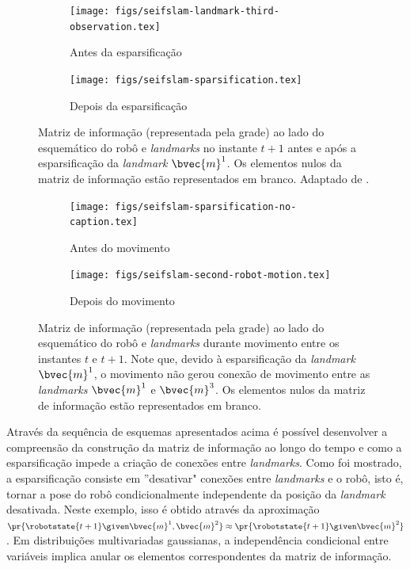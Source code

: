\begin{figure}[h]
  \begin{subfigure}{0.475\textwidth}
    \texttt{[image: figs/seifslam-landmark-third-observation.tex]}
    \caption{Antes da esparsificação}
  \end{subfigure}
  \hfill
  \begin{subfigure}{0.475\textwidth}
    \texttt{[image: figs/seifslam-sparsification.tex]} 
    \caption{Depois da esparsificação}
  \end{subfigure}
  \caption[Esparsificação de um \textit{landmark} na matriz de informação]{Matriz de informação (representada pela grade) ao lado do esquemático do robô e \textit{landmarks} no instante $t+1$ antes e após a esparsificação da \textit{landmark} $\bvec{m}^1$. Os elementos nulos da matriz de informação estão representados em branco. Adaptado de \cite[p.~389]{thrun2005probabilistic}.}
  \label{fig:seifslam-info-matrix-sparsification}
\end{figure}

\begin{figure}[h]
  \begin{subfigure}{0.475\textwidth}
    \texttt{[image: figs/seifslam-sparsification-no-caption.tex]}
    \caption{Antes do movimento}
  \end{subfigure}
  \hfill
  \begin{subfigure}{0.475\textwidth}
    \texttt{[image: figs/seifslam-second-robot-motion.tex]} 
    \caption{Depois do movimento}
    \label{fig:seifslam-info-matrix-construction-second-motion-b}
  \end{subfigure}
  \caption[Elementos da matriz de informação durante o passo de predição logo após esparsificação]{Matriz de informação (representada pela grade) ao lado do esquemático do robô e \textit{landmarks} durante movimento entre os instantes $t$ e $t+1$. Note que, devido à esparsificação da \textit{landmark} $\bvec{m}^1$, o movimento não gerou conexão de movimento entre as \textit{landmarks} $\bvec{m}^1$ e $\bvec{m}^3$. Os elementos nulos da matriz de informação estão representados em branco.}
  \label{fig:seifslam-info-matrix-construction-second-motion}
\end{figure}

Através da sequência de esquemas apresentados acima é possível 
desenvolver a compreensão da construção da matriz de informação 
ao longo do tempo e como a esparsificação impede a criação de 
conexões entre \textit{landmarks}. Como foi mostrado, a 
esparsificação consiste em ''desativar" conexões entre \textit{landmarks} e o robô, isto é, tornar a pose do robô 
condicionalmente independente da posição da \textit{landmark} 
desativada. Neste exemplo, isso é obtido através da aproximação 
$\pr{\robotstate{t+1} \given \bvec{m}^1, \bvec{m}^2} \approx \pr{\robotstate{t+1} \given \bvec{m}^2}$. Em distribuições multivariadas gaussianas, a independência condicional entre 
variáveis implica anular os elementos correspondentes da matriz de informação.

